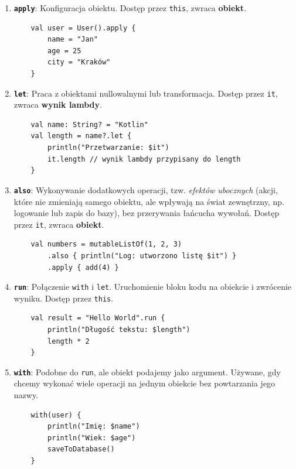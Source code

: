 \begin{enumerate}
    \item \textbf{\texttt{apply}}: Konfiguracja obiektu. Dostęp przez \texttt{this}, zwraca \textbf{obiekt}.
    \begin{verbatim}
    val user = User().apply {
        name = "Jan"
        age = 25
        city = "Kraków"
    }
    \end{verbatim}
    
    \item \textbf{\texttt{let}}: Praca z obiektami nullowalnymi lub transformacja. Dostęp przez \texttt{it}, zwraca \textbf{wynik lambdy}.
    \begin{verbatim}
    val name: String? = "Kotlin"
    val length = name?.let { 
        println("Przetwarzanie: $it")
        it.length // wynik lambdy przypisany do length
    }
    \end{verbatim}
    
    \item \textbf{\texttt{also}}: Wykonywanie dodatkowych operacji, tzw. \textit{efektów ubocznych} (akcji, które nie zmieniają samego obiektu, ale wpływają na świat zewnętrzny, np. logowanie lub zapis do bazy), bez przerywania łańcucha wywołań. Dostęp przez \texttt{it}, zwraca \textbf{obiekt}.
    \begin{verbatim}
    val numbers = mutableListOf(1, 2, 3)
        .also { println("Log: utworzono listę $it") }
        .apply { add(4) }
    \end{verbatim}
    
    \item \textbf{\texttt{run}}: Połączenie \texttt{with} i \texttt{let}. Uruchomienie bloku kodu na obiekcie i zwrócenie wyniku. Dostęp przez \texttt{this}.
    \begin{verbatim}
    val result = "Hello World".run {
        println("Długość tekstu: $length")
        length * 2
    }
    \end{verbatim}
    
    \item \textbf{\texttt{with}}: Podobne do \texttt{run}, ale obiekt podajemy jako argument. Używane, gdy chcemy wykonać wiele operacji na jednym obiekcie bez powtarzania jego nazwy.
    \begin{verbatim}
    with(user) {
        println("Imię: $name")
        println("Wiek: $age")
        saveToDatabase()
    }
    \end{verbatim}
\end{enumerate}

